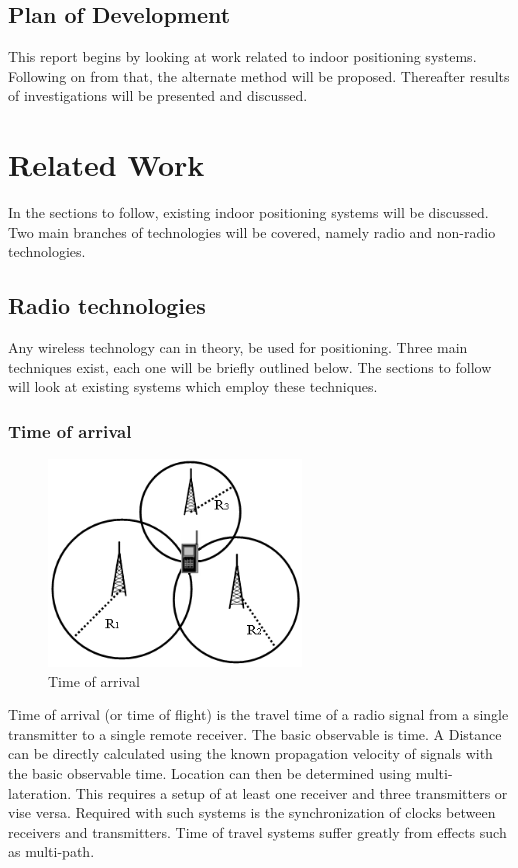\documentclass[11pt,a4paper]{report}
\begin{document}
	\section{Plan of Development}
		This report begins by looking at work related to indoor positioning systems. Following on from that, the alternate method will be proposed. Thereafter results of investigations will be presented and discussed.

\newpage
\chapter{Related Work}
	In the sections to follow, existing indoor positioning systems will be discussed. Two main branches of technologies will be covered, namely radio and non-radio technologies.
	
	\section{Radio technologies}
		Any wireless technology can in theory, be used for positioning. Three main techniques exist, each one will be briefly outlined below. The sections to follow will look at existing systems which employ these techniques.
	
	\subsection{Time of arrival}
		\begin{figure}[h!]
			\centering
			\includegraphics[width=0.6\textwidth]{time_of_arrival}
			\caption{Time of arrival}
		\end{figure}
		Time of arrival (or time of flight) is the travel time of a radio signal from a single transmitter to a single remote receiver. The basic observable is time. A Distance can be directly calculated using the known propagation velocity of signals with the basic observable time. Location can then be determined using multi-lateration. This requires a setup of at least one receiver and three transmitters or vise versa.
		Required with such systems is the synchronization of clocks between receivers and transmitters.
		Time of travel systems suffer greatly from effects such as multi-path.
		\cite{k._pahlavan_wideband_1998}
	
\end{document}
